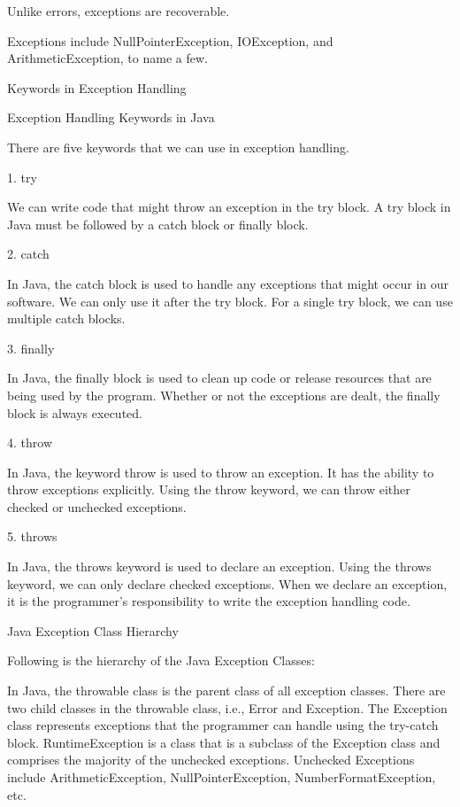 Unlike errors, exceptions are recoverable.

Exceptions include NullPointerException, IOException, and ArithmeticException, to name a few.


Keywords in Exception Handling
 

 

Exception Handling Keywords in Java
 

There are five keywords that we can use in exception handling.

 

1. try
 

We can write code that might throw an exception in the try block. A try block in Java must be followed by a catch block or finally block.

 

2. catch
 

In Java, the catch block is used to handle any exceptions that might occur in our software. We can only use it after the try block. For a single try block, we can use multiple catch blocks.

 

3. finally
 

In Java, the finally block is used to clean up code or release resources that are being used by the program. Whether or not the exceptions are dealt, the finally block is always executed.

 

4. throw
 

In Java, the keyword throw is used to throw an exception. It has the ability to throw exceptions explicitly. Using the throw keyword, we can throw either checked or unchecked exceptions.

 

5. throws
 

In Java, the throws keyword is used to declare an exception. Using the throws keyword, we can only declare checked exceptions. When we declare an exception, it is the programmer's responsibility to write the exception handling code.

Java Exception Class Hierarchy
 

Following is the hierarchy of the Java Exception Classes:

In Java, the throwable class is the parent class of all exception classes.
There are two child classes in the throwable class, i.e., Error and Exception.
The Exception class represents exceptions that the programmer can handle using the try-catch block.
RuntimeException is a class that is a subclass of the Exception class and comprises the majority of the unchecked exceptions. Unchecked Exceptions include ArithmeticException, NullPointerException, NumberFormatException, etc.
 
